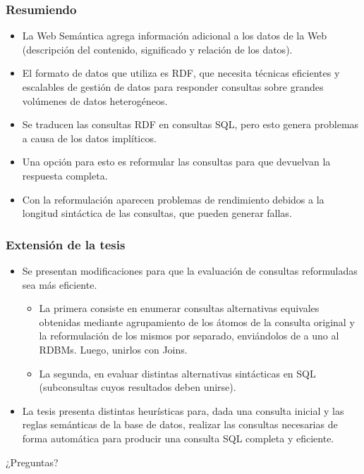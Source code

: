 \documentclass{beamer}
\begin{document}
\begin{frame}
\frametitle{Resumiendo}
\begin{itemize}
\item<1-> La Web Semántica agrega información adicional a los datos de la Web (descripción del contenido, significado y relación de los datos).
\item<2-> El formato de datos que utiliza es RDF, que necesita técnicas eficientes y escalables de gestión de datos para responder consultas sobre grandes volúmenes de datos heterogéneos.
\item<3-> Se traducen las consultas RDF en consultas SQL, pero esto genera problemas a causa de los datos implíticos.
\item<4-> Una opción para esto es reformular las consultas para que devuelvan la respuesta completa.
\item<5-> Con la reformulación aparecen problemas de rendimiento debidos a la longitud sintáctica de las consultas, que pueden generar fallas.
\end{itemize}
\end{frame}



\begin{frame}
\frametitle{Extensión de la tesis}
\begin{itemize}
\item<1-> Se presentan modificaciones para que la evaluación de consultas reformuladas sea más eficiente.
\begin{itemize}
\item<2-> La primera consiste en enumerar consultas alternativas equivales obtenidas mediante agrupamiento de los átomos de la consulta original y la reformulación de los mismos por separado, enviándolos de a uno al RDBMs. Luego, unirlos con Joins.
\item<3-> La segunda, en evaluar distintas alternativas sintácticas en SQL (subconsultas cuyos resultados deben unirse).
\end{itemize}
\item<4-> La tesis presenta distintas heurísticas para, dada una consulta inicial y las reglas semánticas de la base de datos, realizar las consultas necesarias de forma automática para producir una consulta SQL completa y eficiente.
\end{itemize}
\end{frame}




\begin{frame}
\Huge{\centerline{¿Preguntas?}}
\end{frame}

\end{document}
